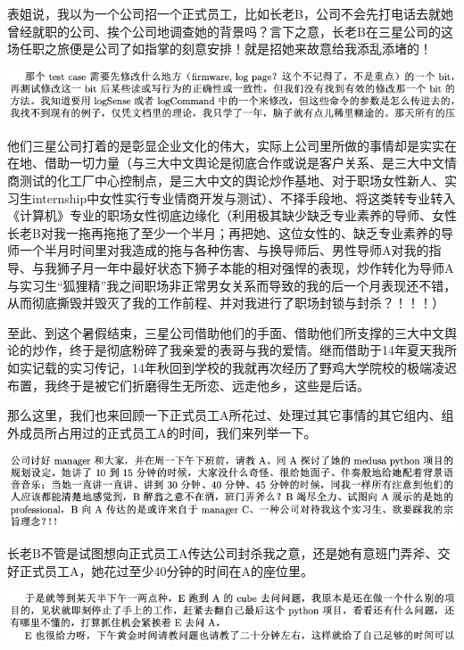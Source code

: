 \documentclass[9pt, b5paper]{article}
\begin{document}
表姐说，我以为一个公司招一个正式员工，比如长老B，公司不会先打电话去就她曾经就职的公司、挨个公司地调查她的背景吗？言下之意，长老B在三星公司的这场任职之旅便是公司了如指掌的刻意安排！就是招她来故意给我添乱添堵的！

\begin{center}
\includegraphics[width=.9\linewidth]{./pic/backups_plans_20210507_114156.png}
\end{center}

他们三星公司打着的是彰显企业文化的伟大，实际上公司里所做的事情却是实实在在地、借助一切力量（与三大中文舆论是彻底合作或说是客户关系、是三大中文情商测试的化工厂中心控制点，是三大中文的舆论炒作基地、对于职场女性新人、实习生internship中女性实行专业情商开发与测试）、不择手段地、将这类转专业转入《计算机》专业的职场女性彻底边缘化（利用极其缺少缺乏专业素养的导师、女性长老B对我一拖再拖拖了至少一个半月；再把她、这位女性的、缺乏专业素养的导师一个半月时间里对我造成的拖与各种伤害、与换导师后、男性导师A对我的指导、与我狮子月一年中最好状态下狮子本能的相对强悍的表现，炒作转化为导师A与实习生“狐狸精”我之间职场非正常男女关系而导致的我的后一个月表现还不错，从而彻底撕毁并毁灭了我的工作前程、并对我进行了职场封锁与封杀？！！！）

至此、到这个暑假结束，三星公司借助他们的手面、借助他们所支撑的三大中文舆论的炒作，终于是彻底粉碎了我亲爱的表哥与我的爱情。继而借助于14年夏天我所如实记载的实习传记，14年秋回到学校的我就再次经历了野鸡大学院校的极端凌迟布置，我终于是被它们折磨得生无所恋、远走他乡，这些是后话。 

那么这里，我们也来回顾一下正式员工A所花过、处理过其它事情的其它组内、组外成员所占用过的正式员工A的时间，我们来列举一下。 

\begin{center}
\includegraphics[width=.9\linewidth]{./pic/readme_20210508_140245.png}
\end{center}

长老B不管是试图想向正式员工A传达公司封杀我之意，还是她有意班门弄斧、交好正式员工A，她花过至少40分钟的时间在A的座位里。 

\begin{center}
\includegraphics[width=.9\linewidth]{./pic/backups_plans_20210508_133752.png}
\end{center}
\end{document}
